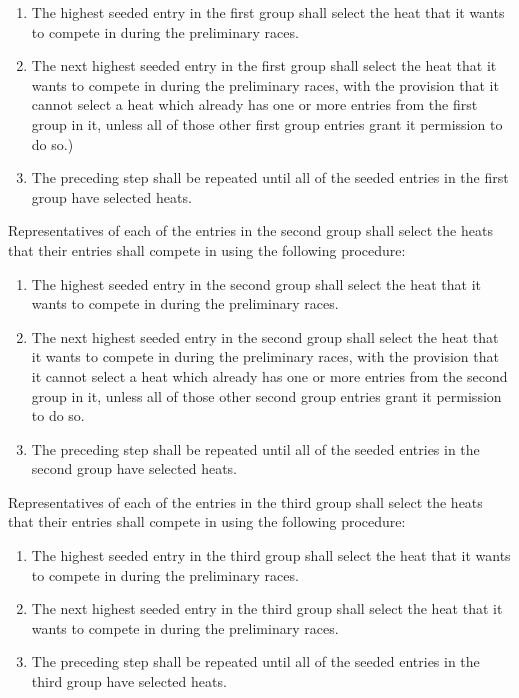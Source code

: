 	\begin{enumerate}

		\item
		The highest seeded entry in the first group shall select the heat that it wants to compete in during the preliminary races.

		\item
		The next highest seeded entry in the first group shall select the heat that it wants to compete in during the preliminary races, with the provision that it cannot select a heat which already has one or more entries from the first group in it, unless all of those other first group entries grant it permission to do so.)

		\item
		The preceding step shall be repeated until all of the seeded entries in the first group have selected heats.

	\end{enumerate}

	Representatives of each of the entries in the second group shall select the heats that their entries shall compete in using the following procedure:

	\begin{enumerate}

		\item
		The highest seeded entry in the second group shall select the heat that it wants to compete in during the preliminary races.

		\item
		The next highest seeded entry in the second group shall select the heat that it wants to compete in during the preliminary races, with the provision that it cannot select a heat which already has one or more entries from the second group in it, unless all of those other second group entries grant it permission to do so.

		\item
		The preceding step shall be repeated until all of the seeded entries in the second group have selected heats.

	\end{enumerate}

	Representatives of each of the entries in the third group shall select the heats that their entries shall compete in using the following procedure:

	\begin{enumerate}

		\item
		The highest seeded entry in the third group shall select the heat that it wants to compete in during the preliminary races.

		\item
		The next highest seeded entry in the third group shall select the heat that it wants to compete in during the preliminary races.

		\item
		The preceding step shall be repeated until all of the seeded entries in the third group have selected heats.

	\end{enumerate}

